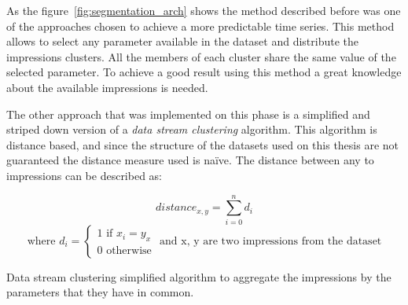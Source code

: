 As the figure~\ref{fig:segmentation_arch} shows the method described before was
one of the approaches chosen to achieve a more predictable time series. This
method allows to select any parameter available in the dataset and distribute
the impressions clusters. All the members of each cluster share the same value
of the selected parameter. To achieve a good result using this method a great
knowledge about the available impressions is needed.

The other approach that was implemented on this phase is a simplified and
striped down version of a \emph{data stream clustering} algorithm. This
algorithm is distance based, and since the structure of the datasets used on
this thesis are not guaranteed the distance measure used is na\"{i}ve. The
distance between any to impressions can be described as:

\begin{center}
\begin{equation*}
  distance_{x,y}= \sum\limits_{i=0}^n d_i
\end{equation*}
\begin{equation*}
\text{where } d_i = \begin{cases} \text{1 if } x_i = y_x\\
\text{0 otherwise}\end{cases} \text{ and x, y are two impressions from the
dataset}
\end{equation*}
\end{center}

\begin{algorithm}
  \LinesNumbered
  \BlankLine

  \BlankLine

  \caption[Data stream clustering]{
    Data stream clustering simplified algorithm to aggregate the impressions by
    the parameters that they have in common.
  }
  \label{alg:pam} \end{algorithm}

